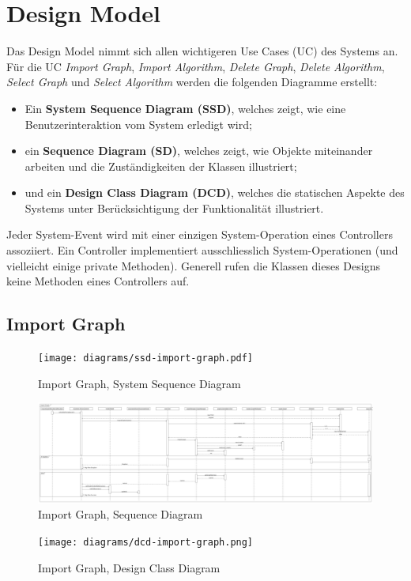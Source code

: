 \section{Design Model}
\label{sec:Design Model}
Das Design Model nimmt sich allen wichtigeren Use Cases (UC) des Systems an. F\"ur die UC \textit{Import Graph}, \textit{Import Algorithm}, \textit{Delete Graph}, \textit{Delete Algorithm}, \textit{Select Graph} und \textit{Select Algorithm} werden die folgenden Diagramme erstellt:
\begin{itemize}
  \item Ein \textbf{System Sequence Diagram (SSD)}, welches zeigt, wie eine Benutzerinteraktion vom System erledigt wird; 
  \item ein \textbf{Sequence Diagram (SD)}, welches zeigt, wie Objekte miteinander arbeiten und die Zust\"andigkeiten der Klassen illustriert; 
  \item und ein \textbf{Design Class Diagram (DCD)}, welches die statischen Aspekte des Systems unter Ber\"ucksichtigung der Funktionalit\"at illustriert.
\end{itemize}
Jeder System-Event wird mit einer einzigen System-Operation eines Controllers assoziiert. Ein Controller implementiert ausschliesslich System-Operationen (und vielleicht einige private Methoden). Generell rufen die Klassen dieses Designs keine Methoden eines Controllers auf.
\newpage
% 
\subsection{Import Graph}
\begin{figure}[H]
    \texttt{[image: diagrams/ssd-import-graph.pdf]}
    \caption{Import Graph, System Sequence Diagram}
    \label{fig:import-graph-ssd}
\end{figure}
\begin{figure}[H]
    \includegraphics[width=\textwidth]{diagrams/sd-import-graph.png}
    \caption{Import Graph, Sequence Diagram}
    \label{fig:import-graph-sd}
\end{figure}
\begin{figure}[H]
    \texttt{[image: diagrams/dcd-import-graph.png]}
    \caption{Import Graph, Design Class Diagram}
    \label{fig:import-graph-dcd}
\end{figure}
\newpage
% 
